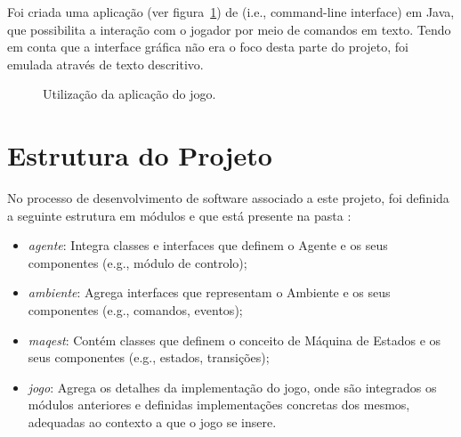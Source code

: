 Foi criada uma aplicação (ver figura~\ref{fig:projeto-parte1-jogo}) de  (i.e., command-line interface) em Java, que possibilita a interação com o jogador por meio de comandos em texto.
Tendo em conta que a interface gráfica não era o foco desta parte do projeto, foi emulada através de texto descritivo.

\begin{figure}[H]
    \begin{center}
    \end{center}
    \caption{Utilização da aplicação do jogo.}\label{fig:projeto-parte1-jogo}
\end{figure}


\section{Estrutura do Projeto}\label{sec:estrutura-do-projeto}

No processo de desenvolvimento de software associado a este projeto, foi definida a seguinte estrutura em módulos e que está presente na pasta :

\begin{itemize}
    \item \textit{agente}: Integra classes e interfaces que definem o Agente e os seus componentes (e.g., módulo de controlo);
    \item \textit{ambiente}: Agrega interfaces que representam o Ambiente e os seus componentes (e.g., comandos, eventos);
    \item \textit{maqest}: Contém classes que definem o conceito de Máquina de Estados e os seus componentes (e.g., estados, transições);
    \item \textit{jogo}: Agrega os detalhes da implementação do jogo, onde são integrados os módulos anteriores e definidas implementações concretas dos mesmos, adequadas ao contexto a que o jogo se insere.
\end{itemize}
